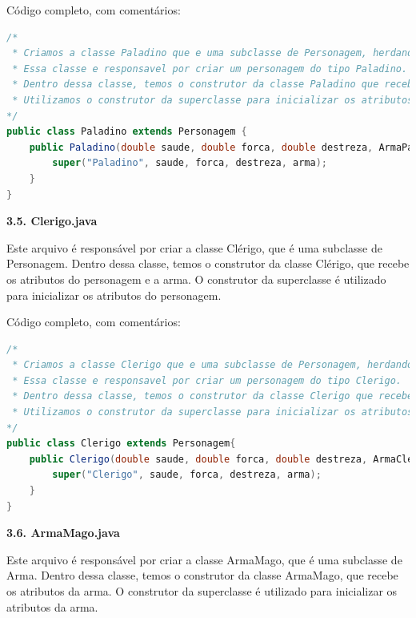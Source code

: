 \documentclass[11pt]{uiobrev}
\begin{document}
Código completo, com comentários: 

\begin{lstlisting}[language=Java, caption={Classe Paladino, subclasse de Personagem}]
/*
 * Criamos a classe Paladino que e uma subclasse de Personagem, herdando os atributos e metodos de personagem.
 * Essa classe e responsavel por criar um personagem do tipo Paladino.
 * Dentro dessa classe, temos o construtor da classe Paladino que recebe os valores de saude, forca, destreza e a arma.
 * Utilizamos o construtor da superclasse para inicializar os atributos de personagem.
*/
public class Paladino extends Personagem {
    public Paladino(double saude, double forca, double destreza, ArmaPaladino arma) {
        super("Paladino", saude, forca, destreza, arma);
    }
}
\end{lstlisting}

\newpage
\Large \textbf{3.5. Clerigo.java}

Este arquivo é responsável por criar a classe Clérigo, que é uma subclasse de Personagem. Dentro dessa classe, temos o construtor da classe Clérigo, que recebe os atributos do personagem e a arma. O construtor da superclasse é utilizado para inicializar os atributos do personagem.

Código completo, com comentários: 

\begin{lstlisting}[language=Java, caption={Classe Clerigo, subclasse de Personagem}]
/*
 * Criamos a classe Clerigo que e uma subclasse de Personagem, herdando os atributos e metodos de personagem.
 * Essa classe e responsavel por criar um personagem do tipo Clerigo.
 * Dentro dessa classe, temos o construtor da classe Clerigo que recebe os valores de saude, forca, destreza e a arma.
 * Utilizamos o construtor da superclasse para inicializar os atributos de personagem.
*/
public class Clerigo extends Personagem{
    public Clerigo(double saude, double forca, double destreza, ArmaClerigo arma){
        super("Clerigo", saude, forca, destreza, arma);
    }
}
\end{lstlisting}

\vspace{0.5cm}
\Large \textbf{3.6. ArmaMago.java}

Este arquivo é responsável por criar a classe ArmaMago, que é uma subclasse de Arma. Dentro dessa classe, temos o construtor da classe ArmaMago, que recebe os atributos da arma. O construtor da superclasse é utilizado para inicializar os atributos da arma.
\end{document}
